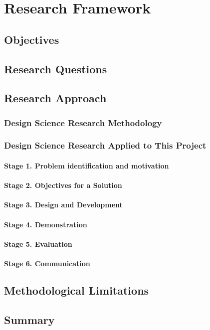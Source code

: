 \chapter{Research Framework\label{cha:method}}

\section{Objectives}

\section{Research Questions}

\section{Research Approach}

\subsection{Design Science Research Methodology}

\subsection{Design Science Research Applied to This Project}

\subsubsection{Stage 1. Problem identification and motivation}

\subsubsection{Stage 2. Objectives for a Solution}

\subsubsection{Stage 3. Design and Development}

\subsubsection{Stage 4. Demonstration}

\subsubsection{Stage 5. Evaluation}

\subsubsection{Stage 6. Communication}

\section{Methodological Limitations}

\section{Summary}